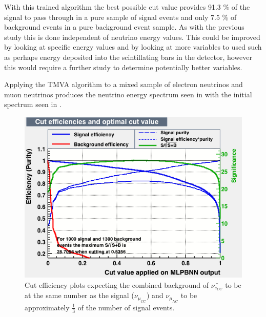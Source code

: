 With this trained algorithm the best possible cut value provides 91.3 \% of the signal to pass through in a pure sample of signal events and only 7.5 \% of background events in a pure background event sample. As with the previous study this is done independent of neutrino energy values. This could be improved by looking at specific energy values and by looking at more variables to used such as perhaps energy deposited into the scintillating bars in the detector, however this would require a further study to determine potentially better variables.

Applying the TMVA algorithm to a mixed sample of electron neutrinos and muon neutrinos produces the neutrino energy spectrum seen in  with the initial spectrum seen in .


\begin{figure}[h!]
\centering
\includegraphics[width=\textwidth]{figures/NeutrinoChap/mvaeffs_MLPBNN10001300.png}
\caption{Cut efficiency plots expecting the combined background of $\bar{\nu_{e_{CC}}}$ to be at the same number as the signal ($\nu_{\mu_{CC}}$) and $\nu_{\mu_{NC}}$ to be approximately $\frac{1}{3}$ of the number of signal events. }
\label{fig:TMVANeucuts}
\end{figure}

